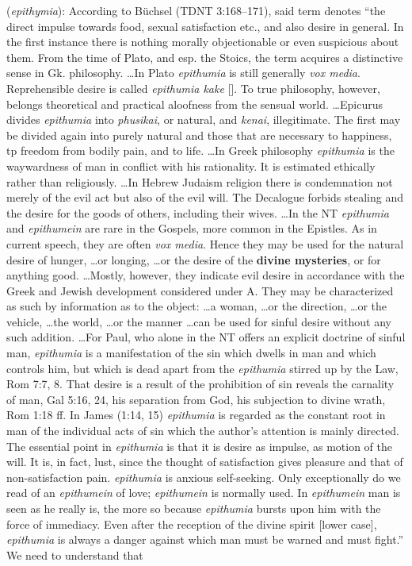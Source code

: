\item[Craving,]

(\textit{epithymia}):
According to Büchsel (TDNT 3:168--171), said term denotes ``the direct impulse towards food, sexual satisfaction etc., and also desire in general. In the first instance there is nothing morally objectionable or even suspicious about them. From the time of Plato, and esp. the Stoics, the term acquires a distinctive sense in Gk. philosophy. \ldots In Plato \emph{epithumia} is still generally \emph{vox media}. Reprehensible desire is called \emph{epithumia kake} []. To true philosophy, however, belongs theoretical and practical aloofness from the sensual world. \ldots Epicurus divides \emph{epithumia} into \emph{phusikai}, or natural, and \emph{kenai}, illegitimate. The first may be divided again into purely natural and those that are necessary to happiness, tp freedom from bodily pain, and to life. \ldots In Greek philosophy \emph{epithumia} is the waywardness of man in conflict with his rationality. It is estimated ethically rather than religiously. \ldots In Hebrew Judaism religion there is condemnation not merely of the evil act but also of the evil will. The Decalogue forbids stealing and the desire for the goods of others, including their wives. \ldots In the NT \emph{epithumia} and \emph{epithumein} are rare in the Gospels, more common in the Epistles. As in current speech, they are often \emph{vox media}. Hence they may be used for the natural desire of hunger, \ldots or longing, \ldots or the desire of the \textbf{divine mysteries}, or for anything good. \ldots Mostly, however, they indicate evil desire in accordance with the Greek and Jewish development considered under A. They may be characterized  as such by information as to the object: \ldots a woman, \ldots or the direction, \ldots or the vehicle, \ldots the world, \ldots or the manner \ldots can be used for sinful desire without any such addition. \ldots For Paul, who alone in the NT offers an explicit doctrine of sinful man, \emph{epithumia} is a manifestation of the sin which  dwells in man and which controls him, but which is dead apart from the \emph{epithumia} stirred up by the Law, Rom 7:7, 8. That desire is a result of the prohibition of sin reveals the carnality of man, Gal 5:16, 24, his separation from God, his subjection to divine wrath, Rom 1:18 ff. In James (1:14, 15) \emph{epithumia} is regarded as the constant root in man of the individual acts of sin which the author's attention is mainly directed. The essential point in \emph{epithumia} is that it is desire as impulse, as motion of the will. It is, in fact, lust, since the thought of satisfaction gives pleasure and that of non-satisfaction pain. \emph{epithumia} is anxious self-seeking. Only exceptionally do we read of an \emph{epithumein} of love; \emph{epithumein} is normally used. In \emph{epithumein} man is seen as he really is, the more so because \emph{epithumia} bursts upon him with the force of immediacy. Even after the reception of the divine spirit [lower case], \emph{epithumia} is always a danger against which man must be warned and must fight.'' We need to understand that 